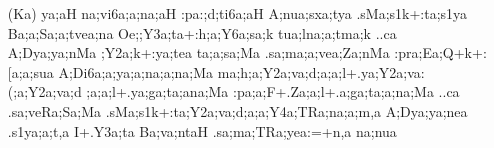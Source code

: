 \begin{itemize}
\begin{itemize}
                \item[({\sktf Ka})] {\sktf ya;aH na;vi6a;a;na;aH
:pa:;d;ti6a;aH A;nua;sxa;tya .sMa;s1k+:ta;s1ya Ba;a;Sa;a;tvea;na Oe;;Y3a;ta\ZF{-}+:h;a;Y6a;sa;k%
 tua;lna;a;tma;k ..ca A;Dya;ya;nMa ;Y2a;k+:ya;tea\ZF{,}
ta;a;sa;Ma .sa;ma;a;vea;Za;nMa :pra;Ea;Q+k+:[a;a;sua A;Di6a;a;ya;a;na;a;na;Ma
ma;h;a;Y2a;va;d;a;a;l+.ya\ZF{-};Y2a;va:(;a;Y2a;va;d%
;a;a;l+.ya;ga{;ta;a}na;Ma :pa;a;F+.Za;a;l+.a;ga;ta;a;na;Ma ..ca .sa;veRa;Sa;Ma
.sMa;s1k+:ta;Y2a;va;d;a;a;Y4a;TRa;na;a;m,a
A;Dya;ya;nea .s1ya;a;t,a\ZF{,} I+.Y3a;ta Ba;va;ntaH .sa;ma;TRa;yea:=+n,a
na;nua }
                \end{itemize}
\end{itemize}

